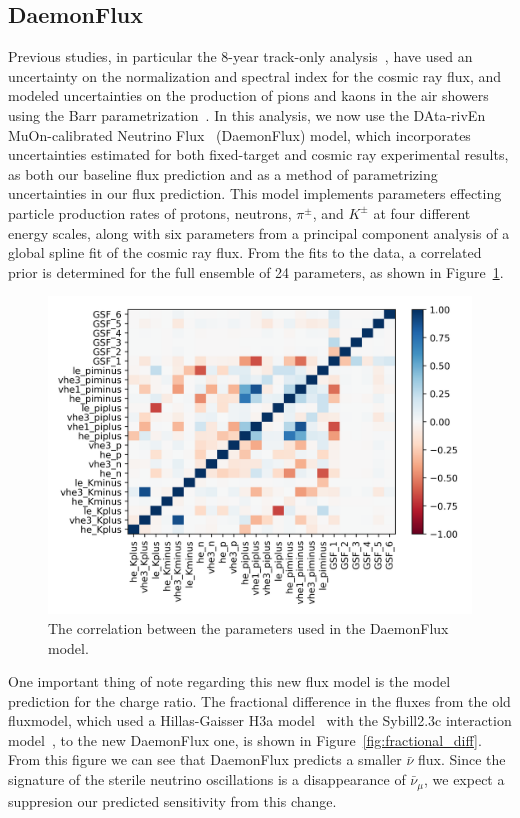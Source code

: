 \documentclass[main.tex]{subfiles}
\begin{document}
\subsection{DaemonFlux}\label{sec:daemon_sense}
Previous studies, in particular the 8-year track-only analysis~\cite{Aartsen_2020,Aartsen_2020_prd}, have used an uncertainty on the normalization and spectral index for the cosmic ray flux, and modeled uncertainties on the production of pions and kaons in the air showers using the Barr parametrization~\cite{PhysRevD.74.094009}. 
In this analysis, we now use the DAta-rivEn MuOn-calibrated Neutrino Flux~\cite{yanez2023daemonflux} (DaemonFlux) model, which incorporates uncertainties estimated for both fixed-target and cosmic ray experimental results, as both our baseline flux prediction and as a method of parametrizing uncertainties in our flux prediction. 
This model implements parameters effecting particle production rates of protons, neutrons, $\pi^{\pm}$, and $K^{\pm}$ at four different energy scales, along with six parameters from a principal component analysis of a global spline fit of the cosmic ray flux. 
From the fits to the data, a correlated prior is determined for the full ensemble of 24 parameters, as shown in Figure~\ref{fig:daemon_cor}.
\begin{figure}
    \centering
    \includegraphics[width=0.7\linewidth]{figures/daemon_cov.png}
    \caption{The correlation between the parameters used in the DaemonFlux model.}\label{fig:daemon_cor}
\end{figure}

One important thing of note regarding this new flux model is the model prediction for the charge ratio. 
The fractional difference in the fluxes from the old fluxmodel, which used a Hillas-Gaisser H3a model~\cite{GAISSER2012801}  with the Sybill2.3c interaction model~\cite{Riehn:2017mfm}, to the new DaemonFlux one, is shown in Figure~\ref{fig:fractional_diff}. 
From this figure we can see that DaemonFlux predicts a smaller $\bar{\nu}$ flux. 
Since the signature of the sterile neutrino oscillations is a disappearance of $\bar{\nu}_{\mu}$, we expect a suppresion our predicted sensitivity from this change.
\end{document}
